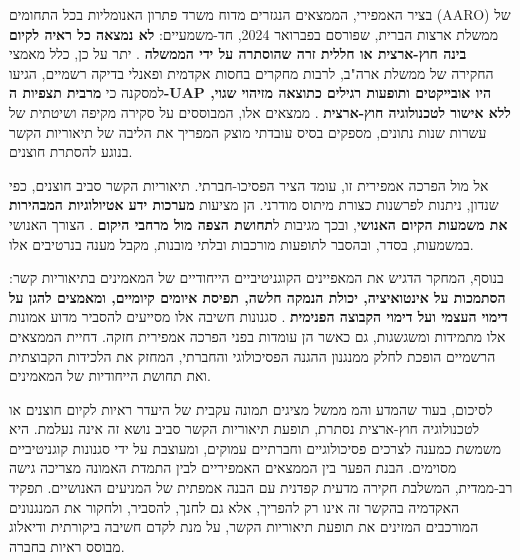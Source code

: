 \documentclass[12pt,a4paper]{article}
\begin{document}
בציר האמפירי, הממצאים הנגזרים מדוח משרד פתרון האנומליות בכל התחומים (AARO) של ממשלת ארצות הברית, שפורסם בפברואר 2024, חד-משמעיים: \textbf{לא נמצאה כל ראיה לקיום בינה חוץ-ארצית או חללית זרה שהוסתרה על ידי הממשלה} \cite{1, 2, 6}. יתר על כן, כלל מאמצי החקירה של ממשלת ארה"ב, לרבות מחקרים בחסות אקדמית ופאנלי בדיקה רשמיים, הגיעו למסקנה כי \textbf{מרבית תצפיות ה-UAP היו אובייקטים ותופעות רגילים כתוצאה מזיהוי שגוי, ללא אישור לטכנולוגיה חוץ-ארצית} \cite{2, 6}. ממצאים אלו, המבוססים על סקירה מקיפה ושיטתית של עשרות שנות נתונים, מספקים בסיס עובדתי מוצק המפריך את הליבה של תיאוריות הקשר בנוגע להסתרת חוצנים.

אל מול הפרכה אמפירית זו, עומד הציר הפסיכו-חברתי. תיאוריות הקשר סביב חוצנים, כפי שנדון, ניתנות לפרשנות כצורת מיתוס מודרני. הן מציעות \textbf{מערכות ידע אטיולוגיות המבהירות את משמעות הקיום האנושי}, ובכך מגיבות ל\textbf{תחושת הצפה מול מרחבי היקום} \cite{3}. הצורך האנושי במשמעות, בסדר, ובהסבר לתופעות מורכבות ובלתי מובנות, מקבל מענה בנרטיבים אלו.

בנוסף, המחקר הדגיש את המאפיינים הקוגניטיביים הייחודיים של המאמינים בתיאוריות קשר: \textbf{הסתמכות על אינטואיציה, יכולת הנמקה חלשה, תפיסת איומים קיומיים, ומאמצים להגן על דימוי העצמי ועל דימוי הקבוצה הפנימית} \cite{4}. סגנונות חשיבה אלו מסייעים להסביר מדוע אמונות אלו מתמידות ומשגשגות, גם כאשר הן עומדות בפני הפרכה אמפירית חזקה. דחיית הממצאים הרשמיים הופכת לחלק ממנגנון ההגנה הפסיכולוגי והחברתי, המחזק את הלכידות הקבוצתית ואת תחושת הייחודיות של המאמינים.

לסיכום, בעוד שהמדע והמ ממשל מציגים תמונה עקבית של היעדר ראיות לקיום חוצנים או לטכנולוגיה חוץ-ארצית נסתרת, תופעת תיאוריות הקשר סביב נושא זה אינה נעלמת. היא משמשת כמענה לצרכים פסיכולוגיים וחברתיים עמוקים, ומעוצבת על ידי סגנונות קוגניטיביים מסוימים. הבנת הפער בין הממצאים האמפיריים לבין התמדת האמונה מצריכה גישה רב-ממדית, המשלבת חקירה מדעית קפדנית עם הבנה אמפתית של המניעים האנושיים. תפקיד האקדמיה בהקשר זה אינו רק להפריך, אלא גם לחנך, להסביר, ולחקור את המנגנונים המורכבים המזינים את תופעת תיאוריות הקשר, על מנת לקדם חשיבה ביקורתית ודיאלוג מבוסס ראיות בחברה.

\printbibliography[title={רשימת מקורות}]
\end{document}
